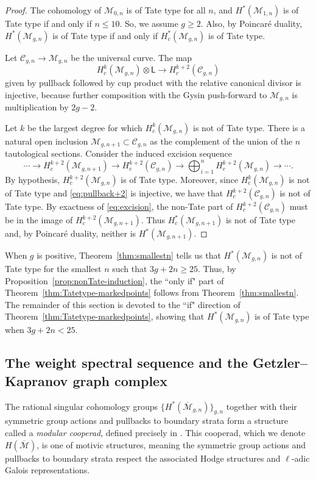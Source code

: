 \documentclass[12pt]{amsart}
\theoremstyle{definition}
\numberwithin{equation}{section}
\newcommand{\M}{\mathcal{M}}
\newcommand{\Mb}{\overline{\M}}
\theoremstyle{definition} %
\theoremstyle{remark}
\begin{document}
\begin{proof}
The cohomology of $\M_{0,n}$ is of Tate type for all $n$, and $H^*(\M_{1,n})$ is of Tate type if and only if $n \leq 10$. So, we assume $g \geq 2$. Also, by Poincar\'e duality, $H^*(\M_{g,n})$ is of Tate type if and only if $H^*_c(\M_{g,n})$ is of Tate type. 

Let $\mathcal{C}_{g,n} \to \M_{g,n}$ be the universal curve. The map
\begin{equation} \label{eq:pullback+2}
H^k_c(\M_{g,n})\otimes \mathsf{L} \to H^{k+2}_c(\mathcal{C}_{g,n})
\end{equation}
given by pullback followed by cup product with the relative canonical divisor is injective, because further composition with the  Gysin push-forward to $\M_{g,n}$ is multiplication by $2g-2$.

Let $k$ be the largest degree for which $H^k_c(\M_{g,n})$ is not of Tate type. %
There is a natural open inclusion $\M_{g,n+1} \subset \mathcal{C}_{g,n}$ as the complement of the union of the $n$ tautological sections. Consider the induced excision sequence
\begin{equation} \label{eq:excision}
\cdots \to H^{k+2}_c (\M_{g,n+1}) \to H^{k+2}_c(\mathcal{C}_{g,n}) \to \bigoplus_{i=1}^n H^{k+2}_c (\M_{g,n}) \to  \cdots.
\end{equation}
By hypothesis, $H^{k+2}_c(\M_{g,n})$ is of Tate type. Moreover, since $H^k_c(\M_{g,n})$ is not of Tate type and \eqref{eq:pullback+2} is injective, we have that $H^{k+2}_c(\mathcal{C}_{g,n})$ is not of Tate type. By exactness of \eqref{eq:excision}, the non-Tate part of $H^{k+2}_c(\mathcal{C}_{g,n})$ must be in the image of $H^{k+2}_c (\M_{g,n+1})$. Thus $H^*_c(\M_{g,n+1})$ is not of Tate type and, by Poincar\'e duality, neither is $H^*(\M_{g,n+1})$.
\end{proof}

\noindent When $g$ is positive, Theorem~\ref{thm:smallestn} tells us that $H^*(\M_{g,n})$ is not of Tate type for the smallest $n$ such that $3g + 2n \geq 25$. Thus, by Proposition~\ref{prop:nonTate-induction}, the ``only if" part of Theorem~\ref{thm:Tatetype-markedpoints} follows from Theorem~\ref{thm:smallestn}. The remainder of this section is devoted to the ``if" direction of Theorem~\ref{thm:Tatetype-markedpoints}, showing that $H^*(\M_{g,n})$ is of Tate type when $3g + 2n < 25$.

 



\subsection{The weight spectral sequence and the Getzler--Kapranov graph complex}
\label{sec:GK def}
The rational singular cohomology groups $\{H^*(\Mb_{g,n})\}_{g,n}$ together with their symmetric group actions and pullbacks to boundary strata form a structure called a 
 \emph{modular cooperad}, defined precisely in \cite{GetzlerKapranov}.
This cooperad, which we denote $H(\Mb)$, is one of motivic structures, meaning the symmetric group actions and pullbacks to boundary strata respect the associated Hodge structures and $\ell$-adic Galois representations. 
\end{document}
